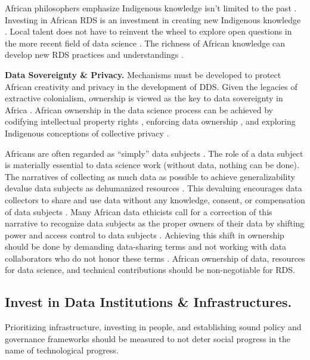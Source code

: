 African philosophers emphasize Indigenous knowledge isn’t limited to the past \cite{hountondji2004producing}. Investing in African RDS is an investment in creating new Indigenous knowledge \cite{uzomah2023african,lauer2017african}. Local talent does not have to reinvent the wheel to explore open questions in the more recent field of data science \cite{lauer2017african,mabe2007security, moahi2007globalization}. The richness of African knowledge can develop new RDS practices and understandings \cite{abdul2023transhumanism, mhlambi2020from, biko2004black, coetzee2004laterMarx}. 

\textbf{Data Sovereignty \& Privacy.}
\label{sec:data_ sov}
Mechanisms must be developed to protect African creativity and privacy in the development of DDS. Given the legacies of extractive colonialism, ownership is viewed as the key to data sovereignty in Africa \cite{gwagwa2019recommendations,shilongo2023creativity,kiemde2022towards}. African ownership in the data science process can be achieved by codifying intellectual property rights \cite{african_union2024continental}, enforcing data ownership \cite{shilongo2023creativity}, and exploring Indigenous conceptions of collective privacy \cite{nwankwo2019africa,goffi2023teaching,mabe2007security,langat2020how, moahi2007globalization}. 

Africans are often regarded as ``simply'' data subjects \cite{shilongo2023creativity}. The role of a data subject is materially essential to data science work (without data, nothing can be done). The narratives of collecting as much data as possible to achieve generalizability devalue data subjects as dehumanized resources \cite{gwagwa2019recommendations,birhane2020algorithmic,olojede2023towards, mhlambi2020from, ndjungu2020blood}. This devaluing encourages data collectors to share and use data without any knowledge, consent, or compensation of data subjects \cite{sinha2023principlesafrofeminist, nyerere1962ujamaa}. Many African data ethicists call for a correction of this narrative to recognize data subjects as the proper owners of their data by shifting power and access control to data subjects \cite{day2023data,ruttkampbloem2023epistemic, abdul2023transhumanism}. Achieving this shift in ownership should be done by demanding data-sharing terms and not working with data collaborators who do not honor these terms \cite{biko2004black, okolo2023responsible}. 
African ownership of data, resources for data science, and technical contributions should be non-negotiable for RDS.


\subsection{Invest in Data Institutions \& Infrastructures.}
Prioritizing infrastructure, investing in people, and establishing sound policy and governance frameworks should be measured to not deter social progress in the name of technological progress.

